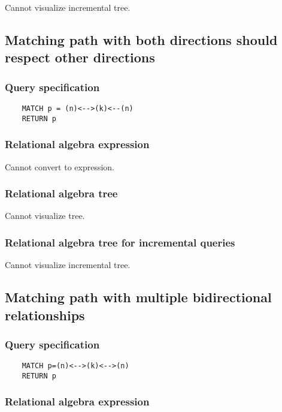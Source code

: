 	Cannot visualize incremental tree.
	\subsection{Matching path with both directions should respect other directions}

	\subsubsection*{Query specification}

	\begin{lstlisting}
	MATCH p = (n)<-->(k)<--(n)
	RETURN p
	\end{lstlisting}


	\subsubsection*{Relational algebra expression}

	Cannot convert to expression.

	\subsubsection*{Relational algebra tree}

	Cannot visualize tree.

	\subsubsection*{Relational algebra tree for incremental queries}

	Cannot visualize incremental tree.
	\subsection{Matching path with multiple bidirectional relationships}

	\subsubsection*{Query specification}

	\begin{lstlisting}
	MATCH p=(n)<-->(k)<-->(n)
	RETURN p
	\end{lstlisting}


	\subsubsection*{Relational algebra expression}

